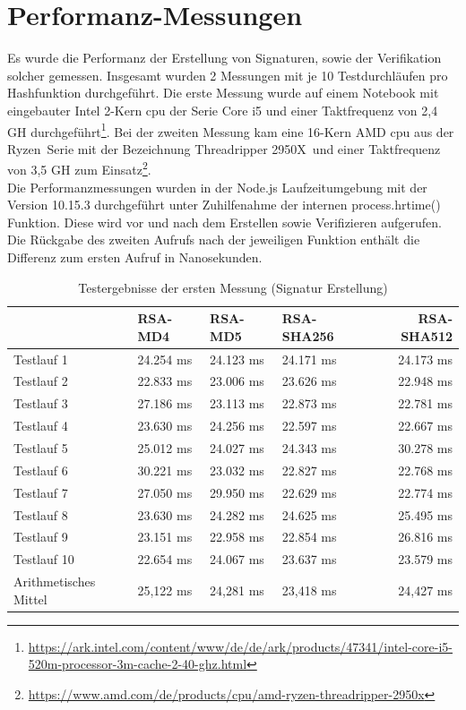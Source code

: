\section{Performanz-Messungen}
Es wurde die Performanz der Erstellung von Signaturen, sowie der Verifikation solcher gemessen. Insgesamt wurden 2 Messungen mit je 10 Testdurchläufen pro Hashfunktion durchgeführt. Die erste Messung wurde auf einem Notebook mit eingebauter Intel 2-Kern \gls{cpu} der Serie Core i5 und einer Taktfrequenz von 2,4 GH durchgeführt\footnote{\url{https://ark.intel.com/content/www/de/de/ark/products/47341/intel-core-i5-520m-processor-3m-cache-2-40-ghz.html}}. Bei der zweiten Messung kam eine 16-Kern AMD \gls{cpu} aus der \glqq Ryzen\grqq~Serie mit der Bezeichnung \glqq Threadripper 2950X\grqq~und einer Taktfrequenz von 3,5 GH zum Einsatz\footnote{\url{https://www.amd.com/de/products/cpu/amd-ryzen-threadripper-2950x}}.\\
Die Performanzmessungen wurden in der Node.js Laufzeitumgebung mit der Version 10.15.3 durchgeführt unter Zuhilfenahme der internen process.hrtime() Funktion. Diese wird vor und nach dem Erstellen sowie Verifizieren aufgerufen. Die Rückgabe des zweiten Aufrufs nach der jeweiligen Funktion enthält die Differenz zum ersten Aufruf in Nanosekunden.
\begin{table}[h]
	\begin{tabularx}{\textwidth}{p{}|X|X|X|r}
		& RSA-MD4 & RSA-MD5 & RSA-SHA256 & RSA-SHA512\\
		\hline
		Testlauf 1& 24.254 ms& 24.123 ms& 24.171 ms& 24.173 ms\\
		Testlauf 2& 22.833 ms& 23.006 ms& 23.626 ms& 22.948 ms\\
		Testlauf 3& 27.186 ms& 23.113 ms& 22.873 ms& 22.781 ms\\
		Testlauf 4& 23.630 ms& 24.256 ms& 22.597 ms& 22.667 ms\\
		Testlauf 5& 25.012 ms& 24.027 ms& 24.343 ms& 30.278 ms\\
		Testlauf 6& 30.221 ms& 23.032 ms& 22.827 ms& 22.768 ms\\
		Testlauf 7& 27.050 ms& 29.950 ms& 22.629 ms& 22.774 ms\\
		Testlauf 8& 23.630 ms& 24.282 ms& 24.625 ms& 25.495 ms\\
		Testlauf 9& 23.151 ms& 22.958 ms& 22.854 ms& 26.816 ms\\
		Testlauf 10& 22.654 ms& 24.067 ms& 23.637 ms& 23.579 ms\\
		\hline
		Arithmetisches Mittel& 25,122 ms& 24,281 ms& 23,418 ms& 24,427 ms\\
	\end{tabularx}
	\caption{Testergebnisse der ersten Messung (Signatur Erstellung)}
\end{table}
